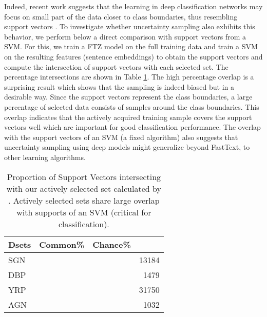 \documentclass[11pt,a4paper]{article}
\begin{document}
Indeed, recent work suggests that the learning in deep classification networks may focus on small part of the data closer to class boundaries, thus resembling support vectors \cite{xu2018convergence, toneva19example}. To investigate whether uncertainty sampling also exhibits this behavior, we perform below a direct comparison with support vectors from a SVM. For this, we train a FTZ model on the full training data and train a SVM on the resulting features (sentence embeddings) to obtain the support vectors and compute the intersection of support vectors with each selected set. The percentage intersections are shown in Table \ref{tab:support}. The high percentage overlap is a surprising result which shows that the sampling is indeed biased but in a desirable way. Since the support vectors represent the class boundaries, a large percentage of selected data consists of samples around the class boundaries. This overlap indicates that the actively acquired training sample covers the support vectors well which are important for good classification performance. The overlap with the support vectors of an SVM (a fixed algorithm) also suggests that uncertainty sampling using deep models might generalize beyond FastText, to other learning algorithms. 
\begin{table}[t]
\small\addtolength{\tabcolsep}{-3pt}
\centering
  \begin{tabular}{|l|r|r|r|}
  \hline
  Dsets & Common\% & Chance\% &   \\ \hline
  SGN &  &  & 13184  \\ \hline 
  DBP &  &  & 1479   \\ \hline
  YRP &  &  & 31750    \\\hline
  AGN  &  &  & 1032  \\ \hline 
  \end{tabular}
\caption{Proportion of Support Vectors intersecting with our actively selected set calculated by . Actively selected sets share large overlap with supports of an SVM (critical for classification).} 
\label{tab:support}
\vspace{-0.8cm}
\end{table}
\end{document}
